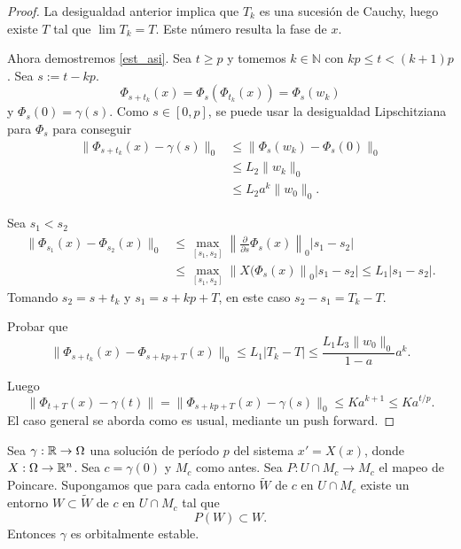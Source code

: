 \begin{proof}
La desigualdad anterior implica que $T_k$ es una sucesión de Cauchy, luego existe $T$ tal que $\lim T_k=T$. Este número resulta la fase de $x$. 

Ahora demostremos  \eqref{est_asi}. Sea $t\geq p$ y tomemos $k\in\mathbb{N}$ con $kp\leq t<(k+1)p$. Sea $s:=t-kp$. 
\[\Phi_{s+t_k}(x)=\Phi_{s}\left(\Phi_{t_k}(x)\right)=\Phi_{s}(w_k)\]
y $\Phi_s(0)=\gamma(s)$. Como $s\in [0,p]$, se puede usar la desigualdad Lipschitziana para $\Phi_s$ para conseguir
\[\begin{split}
  \|\Phi_{s+t_k}(x)-\gamma(s)\|_0 &\leq \|\Phi_s(w_k)-\Phi_s(0)\|_0\\&\leq L_2\|w_k\|_0\\&\leq L_2a^k\|w_0\|_0. 
  \end{split}
\]





Sea $s_1<s_2$  
\[\begin{split}
   \|\Phi_{s_1}(x)-\Phi_{s_2}(x)\|_0 &\leq \max_{[s_1,s_2]} \left\|\frac{\partial}{\partial s} \Phi_s(x) \right\|_0|s_1-s_2|\\
 &\leq \max_{[s_1,s_2]} \left\| X(\Phi_s(x) \right\|_0|s_1-s_2|\leq L_1 |s_1-s_2|.
  \end{split}
\]
Tomando $s_2=s+t_k$ y $s_1=s+kp+T$, en este caso $s_2-s_1=T_k-T$.

\begin{ejercicio}{} Probar que
\[ 
   \|\Phi_{s+t_k}(x)-\Phi_{s+kp+T}(x)\|_0 \leq L_1 |T_k-T|\leq \frac{L_1L_3\|w_0\|_0}{1-a}a^k.
 \]
 \end{ejercicio}
Luego
\[ \|\Phi_{t+T}(x)-\gamma(t)\|=\|\Phi_{s+kp+T}(x)-\gamma(s)\|_0\leq Ka^{k+1}\leq Ka^{t/p}.   \]
El caso general se aborda como es usual, mediante un push forward.
\end{proof}




\begin{corolario}{}
  Sea $\gamma:\mathbb{R}\to\Omega$ una solución de período $p$ del sistema $x'=X(x)$, donde $X:\Omega\to \mathbb{R}^n$. Sea $c=\gamma(0)$ y $M_c$ como antes. 
Sea $P:U\cap M_c\to M_c$ el mapeo de Poincare. Supongamos que para cada entorno $\tilde{W}$ de $c$  en $U\cap M_c$ existe un entorno $W\subset\tilde{W}$
de $c$  en $U\cap M_c$ tal que
\[P(W)\subset W.\]
Entonces $\gamma$ es orbitalmente estable. 
\end{corolario}







